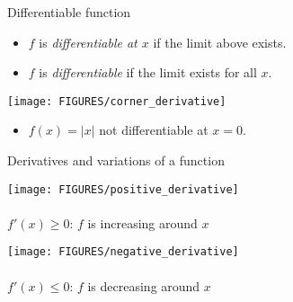 \documentclass[8pt,dvipsnames]{beamer}
\begin{document}
\begin{frame}{Differentiable function}
  \begin{itemize}
    \item $f$ is \emph{differentiable at $x$} if the limit above exists.
    \item $f$ is \emph{differentiable} if the limit exists for all $x$.
  \end{itemize}
  \pause
  \begin{center}
    \texttt{[image: FIGURES/corner\_derivative]}
  \end{center}
  \pause
  \begin{itemize}
    \item $f(x) = |x|$ not differentiable at $x=0$.
  \end{itemize}
\end{frame}

\begin{frame}{Derivatives and variations of a function}
  \begin{overprint}
    \begin{center}
      \texttt{[image: FIGURES/positive\_derivative]}\\~\\
      $f'(x) \geq 0$: $f$ is increasing around $x$
    \end{center}
    \begin{center}
      \texttt{[image: FIGURES/negative\_derivative]}\\~\\
      $f'(x) \leq 0$: $f$ is decreasing around $x$
    \end{center}
  \end{overprint}
\end{frame}
\end{document}

